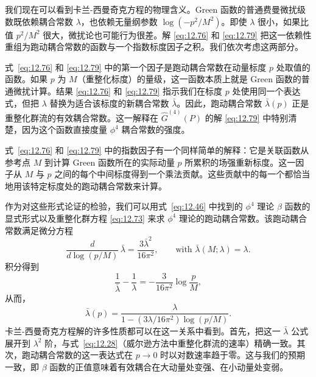 我们现在可以看到卡兰-西曼奇克方程的物理含义。Green 函数的普通费曼微扰级数既依赖耦合常数 $\lambda$，也依赖无量纲参数 $\log(-p^2/M^2)$。即使 $\lambda$ 很小，如果比值 $p^2/M^2$ 很大，微扰论也可能行为很差。解 \eqref{eq:12.76} 和 \eqref{eq:12.79} 把这一依赖性重组为跑动耦合常数的函数与一个指数标度因子之积。我们依次考虑这两部分。

式~\eqref{eq:12.76} 和 \eqref{eq:12.79} 中的第一个因子是跑动耦合常数在动量标度 $p$ 处取值的函数。如果 $p$ 为 $M$（重整化标度）的量级，这一函数本质上就是 Green 函数的普通微扰计算。结果 \eqref{eq:12.76} 和 \eqref{eq:12.79} 指示我们在标度 $p$ 处使用同一个表达式，但把 $\lambda$ 替换为适合该标度的新耦合常数 $\bar{\lambda}$。因此，跑动耦合常数 $\bar{\lambda}(p)$ 正是重整化群流的有效耦合常数。这一解释在 $\hat{G}^{(4)}(P)$ 的解 \eqref{eq:12.79} 中特别清楚，因为这个函数直接度量 $\phi^4$ 耦合常数的强度。

式~\eqref{eq:12.76} 和 \eqref{eq:12.79} 中的指数因子有一个同样简单的解释：它是关联函数从参考点 $M$ 到计算 Green 函数所在的实际动量 $p$ 所累积的场强重新标度。这一因子从 $M$ 与 $p$ 之间的每个中间标度得到一个乘法贡献。这些贡献中的每一个都恰当地用该特定标度处的跑动耦合常数来计算。

作为对这些形式论证的检验，我们可以用式~\eqref{eq:12.46} 中找到的 $\phi^4$ 理论 $\beta$ 函数的显式形式以及重整化群方程 \eqref{eq:12.73} 来求 $\phi^4$ 理论的跑动耦合常数。该跑动耦合常数满足微分方程
\begin{equation}
  \frac{d}{d\log(p/M)}\,\bar{\lambda} = \frac{3\bar{\lambda}^2}{16\pi^2},
  \qquad\text{with } \bar{\lambda}(M;\lambda) = \lambda .
  \label{eq:12.81}
\end{equation}
积分得到
\begin{equation}
  \frac{1}{\bar{\lambda}} - \frac{1}{\lambda} = -\frac{3}{16\pi^2}\log
    \frac{p}{M},
\end{equation}
从而，
\begin{equation}
  \bar{\lambda}(p) = \frac{\lambda}{1 - (3\lambda/16\pi^2)\log(p/M)} .
  \label{eq:12.82}
\end{equation}
卡兰-西曼奇克方程解的许多性质都可以在这一关系中看到。首先，把这一 $\bar{\lambda}$ 公式展开到 $\lambda^2$ 阶，与式~\eqref{eq:12.28}（威尔逊方法中重整化群流的速率）精确一致。其次，跑动耦合常数的这一表达式在 $p\to 0$ 时以对数速率趋于零。这与我们的预期一致，即 $\beta$ 函数的正值意味着有效耦合在大动量处变强、在小动量处变弱。

